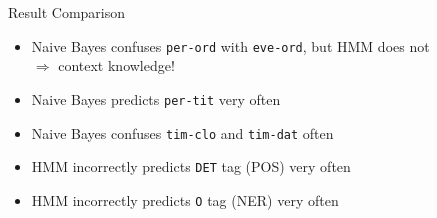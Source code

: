 \begin{frame}{Result Comparison}{}
	\begin{itemize}
		\item Naive Bayes confuses \texttt{per-ord} with \texttt{eve-ord}, but HMM does not \\
			$\Rightarrow$ context knowledge!
		\item Naive Bayes predicts \texttt{per-tit} very often
		\item Naive Bayes confuses \texttt{tim-clo} and \texttt{tim-dat} often
		\item HMM incorrectly predicts \texttt{DET} tag (POS) very often
		\item HMM incorrectly predicts \texttt{O} tag (NER) very often
	\end{itemize}
\end{frame}


\makethanks

